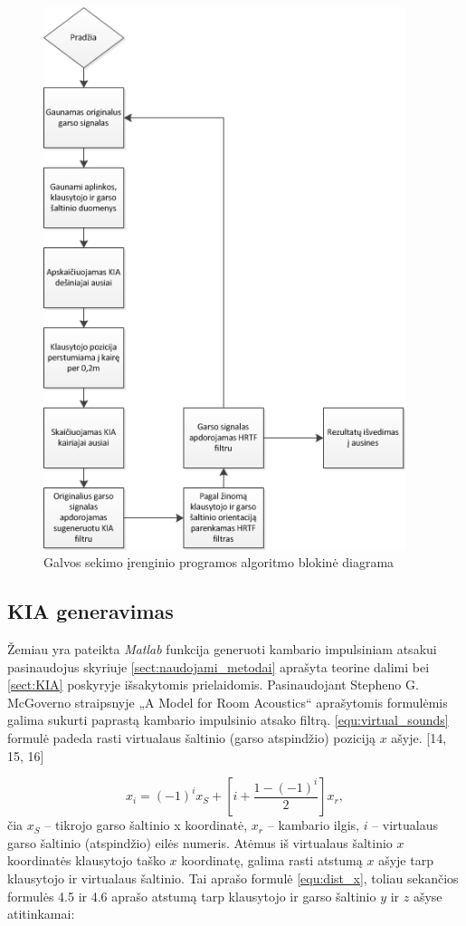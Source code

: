 \documentclass[]{vgtuef}
\begin{document}
\begin{figure}[!h]
  \centering
  \includegraphics[width=400px]{img/binaural_schem.png}
  \caption{Galvos sekimo įrenginio programos algoritmo blokinė diagrama}
  \label{fig:binaural_schem}
\end{figure}

\newpage

\subsection{KIA generavimas}

Žemiau yra pateikta \textit{Matlab} funkcija generuoti kambario impulsiniam atsakui pasinaudojus skyriuje \ref{sect:naudojami_metodai} aprašyta teorine dalimi bei \ref{sect:KIA} poskyryje išsakytomis prielaidomis.
Pasinaudojant Stepheno G. McGoverno straipsnyje „A Model for Room Acoustics“ aprašytomis formulėmis galima sukurti paprastą kambario impulsinio atsako filtrą.
\ref{equ:virtual_sounds} formulė padeda rasti virtualaus šaltinio (garso atspindžio) poziciją $x$ ašyje. [14, 15, 16]

\begin{equation}
x_{i}=(-1)^{i}x_{S}+\left[ i+\frac{1-(-1)^{i}}{2}\right] x_{r},
\label{equ:virtual_sounds}
\end{equation}
\noindent
čia $x_{S}$ – tikrojo garso šaltinio x koordinatė, $x_{r}$ – kambario ilgis, $i$ – virtualaus garso šaltinio (atspindžio) eilės numeris. Atėmus iš virtualaus šaltinio $x$ koordinatės klausytojo taško $x$ koordinatę, galima rasti atstumą $x$ ašyje tarp klausytojo ir virtualaus šaltinio. Tai aprašo formulė \ref{equ:dist_x}, toliau sekančios formulės 4.5 ir 4.6 aprašo atstumą tarp klausytojo ir garso šaltinio $y$ ir $z$ ašyse atitinkamai:
\end{document}
